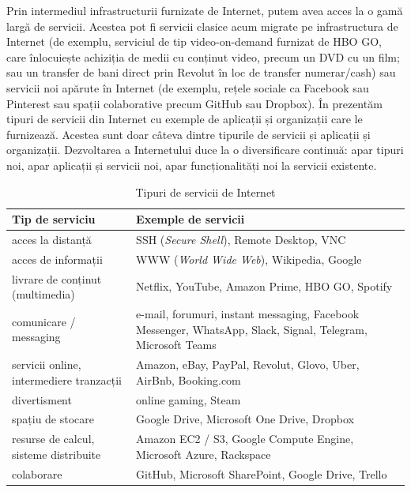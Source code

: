 Prin intermediul infrastructurii furnizate de Internet, putem avea acces la o gamă largă de servicii.
Acestea pot fi servicii clasice acum migrate pe infrastructura de Internet (de exemplu, serviciul de tip video-on-demand furnizat de HBO GO, care înlocuiește achiziția de medii cu conținut video, precum un DVD cu un film; sau un transfer de bani direct prin Revolut în loc de transfer numerar/cash) sau servicii noi apărute în Internet (de exemplu, rețele sociale ca Facebook sau Pinterest sau spații colaborative precum GitHub sau Dropbox).
În  prezentăm tipuri de servicii din Internet cu exemple de aplicații și organizații care le furnizează.
Acestea sunt doar câteva dintre tipurile de servicii și aplicații și organizații.
Dezvoltarea a Internetului duce la o diversificare continuă: apar tipuri noi, apar aplicații și servicii noi, apar funcționalități noi la servicii existente.

\begin{table}[!htb]
  \scriptsize
  \begin{center}
    \begin{tabular}{ p{} p{} }
      \toprule
        \textbf{Tip de serviciu} &
        \textbf{Exemple de servicii} \\
      \midrule
        acces la distanță &
        SSH (\textit{Secure Shell}), Remote Desktop, VNC \\

      \midrule
        acces de informații &
        WWW (\textit{World Wide Web}), Wikipedia, Google \\

      \midrule
        livrare de conținut (multimedia) &
        Netflix, YouTube, Amazon Prime, HBO GO, Spotify \\

      \midrule
        comunicare / messaging &
        e-mail, forumuri, instant messaging, Facebook Messenger, WhatsApp, Slack, Signal, Telegram, Microsoft Teams \\

      \midrule
        servicii online, intermediere tranzacții &
        Amazon, eBay, PayPal, Revolut, Glovo, Uber, AirBnb, Booking.com \\

      \midrule
        divertisment &
        online gaming, Steam \\

      \midrule
        spațiu de stocare &
        Google Drive, Microsoft One Drive, Dropbox \\

      \midrule
        resurse de calcul, sisteme distribuite &
        Amazon EC2 / S3, Google Compute Engine, Microsoft Azure, Rackspace \\

      \midrule
        colaborare &
        GitHub, Microsoft SharePoint, Google Drive, Trello \\
      \bottomrule
    \end{tabular}
  \end{center}
  \caption{Tipuri de servicii de Internet}
  \label{tab:net:services}
\end{table}

